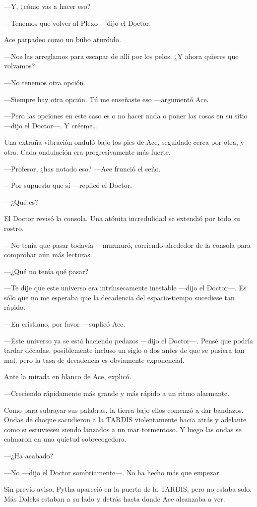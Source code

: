 ---Y, ¿cómo vas a hacer eso?

---Tenemos que volver al Plexo ---dijo el Doctor.

Ace parpadeo como un búho aturdido.

---Nos las arreglamos para escapar de allí por los pelos. ¿Y
ahora quieres que volvamos?

---No tenemos otra opción.

---Siempre hay otra opción. Tú me enseñaste eso ---argumentó
Ace.

---Pero las opciones en este caso es o no hacer nada o poner las
cosas en su sitio ---dijo el Doctor---. Y créeme\ldots{}

Una extraña vibración onduló bajo los pies de Ace, seguidade
cerca por otra, y otra. Cada ondulación era progresivamente más fuerte.

---Profesor, ¿has notado eso? ---Ace frunció el ceño.

---Por supuesto que sí ---replicó el Doctor.

---¿Qué es?

El Doctor revisó la consola. Una atónita incredulidad se
extendió por todo su rostro.

---No tenía que pasar todavía ---murmuró, corriendo alrededor de
la consola para comprobar aún más lecturas.

---¿Qué no tenía qué pasar?

---Te dije que este universo era intrínsecamente inestable
---dijo el Doctor---. Es sólo que no me esperaba que la decadencia del
espacio-tiempo sucediese tan rápido.

---En cristiano, por favor ---suplicó Ace.

---Este universo ya se está haciendo pedazos ---dijo el
Doctor---. Pensé que podría tardar décadas, posiblemente incluso un
siglo o dos antes de que se pusiera tan mal, pero la tasa de decadencia
es obviamente exponencial.

Ante la mirada en blanco de Ace, explicó.

---Creciendo rápidamente más grande y más rápido a un ritmo alarmante.

Como para subrayar sus palabras, la tierra bajo ellos comenzó a
dar bandazos. Ondas de choque sacudieron a la TARDIS violentamente hacia
atrás y adelante como si estuviesen siendo lanzados a un mar tormentoso.
Y luego las ondas se calmaron en una quietud sobrecogedora.

---¿Ha acabado?

---No ---dijo el Doctor sombríamente---. No ha hecho más que
empezar.

Sin previo aviso, Pytha apareció en la puerta de la TARDIS, pero
no estaba solo. Más Daleks estaban a su lado y detrás hasta donde Ace
alcanzaba a ver.
